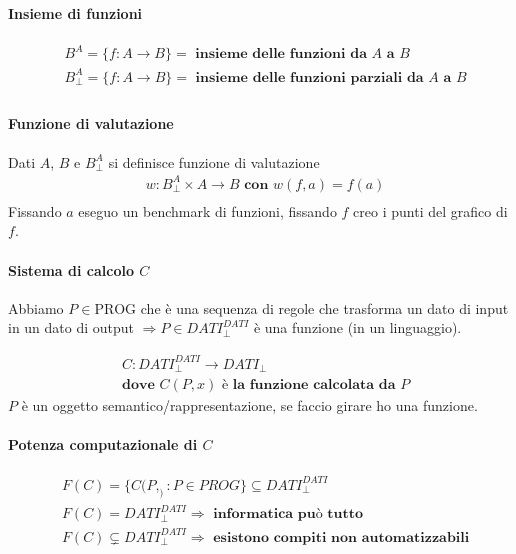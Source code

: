 \documentclass{article}
\begin{document}
\paragraph{Insieme di funzioni}
\begin{displaymath}
    \begin{split}
        &B^A = \{ f:A \rightarrow B\} = \textbf{ insieme delle funzioni da $A$ a $B$} \\
        &B_{\perp}^{A} = \{ f:A \rightarrow B\} = \textbf{ insieme delle funzioni parziali da $A$ a $B$} \\
    \end{split}
\end{displaymath}
\paragraph{Funzione di valutazione}
Dati $A$, $B$ e $B_{\perp}^{A}$ si definisce funzione di valutazione
\begin{displaymath}
    \begin{split}
        &w:B_{\perp}^{A} \times A \rightarrow B \textbf{ con } w(f,a) = f(a) \\
    \end{split}
\end{displaymath}
Fissando $a$ eseguo un benchmark di funzioni, fissando $f$ creo i punti del grafico di $f$.

\paragraph{Sistema di calcolo $C$}
Abbiamo $P \in \text{PROG}$ che è una sequenza di regole che trasforma un dato di input in un dato di output $\Rightarrow P \in \textit{DATI}_{\perp}^{\textit{DATI}}$ è una funzione (in un linguaggio).

\begin{displaymath}
\begin{split}
    &C:\textit{DATI}_{\perp}^{\textit{DATI}} \rightarrow \textit{DATI}_{\perp} \\
    &\textbf{dove } C(P,x) \textbf{ è la funzione calcolata da $P$}
\end{split}
\end{displaymath}
$P$ è un oggetto semantico/rappresentazione, se faccio girare ho una funzione.
\paragraph{Potenza computazionale di $C$}
\begin{displaymath}
\begin{split}
    &F(C)= \{ C(P,_): P \in \textit{PROG}\} \subseteq \textit{DATI}_{\perp}^{\textit{DATI}}\\
    &F(C) = \textit{DATI}_{\perp}^{\textit{DATI}} \Rightarrow \textbf{ informatica può tutto}\\
    &F(C) \subsetneq \textit{DATI}_{\perp}^{\textit{DATI}} \Rightarrow \textbf{ esistono compiti non automatizzabili}
\end{split}
\end{displaymath}
\end{document}
